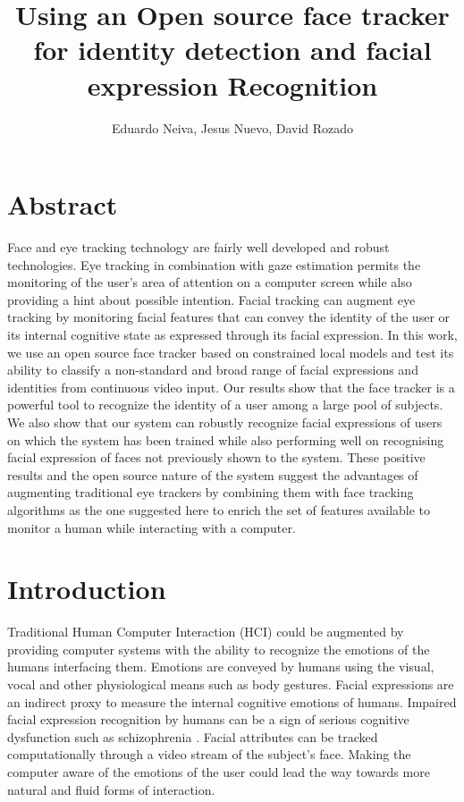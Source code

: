\documentclass[]{article}
\title{Using an Open source face tracker for identity detection and facial expression Recognition}
\author{Eduardo Neiva, Jesus Nuevo, David Rozado}
\begin{document}
\maketitle

\section{Abstract}
Face and eye tracking technology are fairly well developed and robust technologies. Eye tracking in combination with
gaze estimation permits the monitoring of the user's area of attention on a computer screen while also providing a hint
about possible intention. Facial tracking can augment eye tracking by monitoring facial features that can convey the
identity of the user or its internal cognitive state as expressed through its facial expression. In this work, we use an
open source face tracker based on constrained local models and test its ability to classify a non-standard and broad
range of facial expressions and identities from continuous video input. Our results show that the face tracker is a
powerful tool to recognize the identity of a user among a large pool of subjects. We also show that our system can
robustly recognize facial expressions of users on which the system has been trained while also performing well on
recognising facial expression of faces not previously shown to the system. These positive results and the open source
nature of the system suggest the advantages of augmenting traditional eye trackers by combining them with face tracking
algorithms as the one suggested here to enrich the set of features available to monitor a human while interacting with a
computer.


\section{Introduction}
Traditional Human Computer Interaction (HCI) could be augmented by providing computer systems with the ability to
recognize the emotions of the humans interfacing them. Emotions are conveyed by humans using the visual, vocal
and other physiological means such as body gestures. Facial expressions are an indirect proxy to measure the internal
cognitive emotions of humans. Impaired facial expression recognition by humans can be a sign of serious cognitive
dysfunction such as schizophrenia \cite{Edwards2002789}.  Facial attributes can be tracked computationally through a
video stream of the subject's face. Making the computer aware of the emotions of the user could lead the way towards
more natural and fluid forms of interaction.
\end{document}
